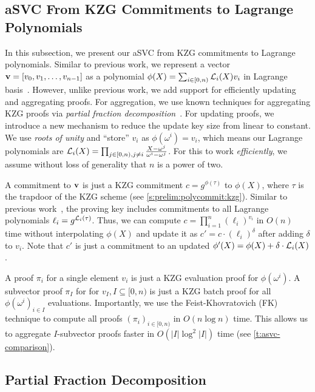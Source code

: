 \subsection{aSVC From KZG Commitments to Lagrange Polynomials}
\label{s:asvc:from-kzg}

In this subsection, we present our aSVC from KZG commitments to Lagrange polynomials.
Similar to previous work, we represent a vector $\bm{\mathrm{v}} = [v_0, v_1, \dots, v_{n-1}]$ as a polynomial $\phi(X)=\sum_{i\in[0,n)} \mathcal{L}_i(X)v_i$ in Lagrange basis~\cite{KZG10a,CDHK15,Tomescu20,GRWZ20}.
However, unlike previous work, we add support for efficiently updating and aggregating proofs.
For aggregation, we use known techniques for aggregating KZG proofs via \textit{partial fraction decomposition}~\cite{Buterin20UsingPoly}.
For updating proofs, we introduce a new mechanism to reduce the update key size from linear to constant.
We use \textit{roots of unity} and ``store'' $v_i$ as $\phi(\omega^i)=v_i$, which means our Lagrange polynomials are $\mathcal{L}_i(X)=\prod_{j\in [0,n),j\ne i} \frac{X-\omega^j}{\omega^i - \omega^j}$.
For this to work \textit{efficiently}, we assume without loss of generality that $n$ is a power of two.


A commitment to $\bm{\mathrm{v}}$ is just a KZG commitment $c=g^{\phi(\tau)}$ to $\phi(X)$, where $\tau$ is the trapdoor of the KZG scheme (see \cref{s:prelim:polycommit:kzg}).
Similar to previous work~\cite{CDHK15}, the proving key includes commitments to all Lagrange polynomials $\ell_i = g^{\mathcal{L}_i(\tau)}$.
Thus, we can compute $c=\prod_{i=1}^n (\ell_i)^{v_i}$ in $O(n)$ time without interpolating $\phi(X)$ and update it as
$c' = c\cdot (\ell_i)^{\delta}$ after adding $\delta$ to $v_i$.
Note that $c'$ is just a commitment to an updated $\phi'(X)=\phi(X)+\delta\cdot\mathcal{L}_i(X)$.

A proof $\pi_i$ for a single element $v_i$ is just a KZG evaluation proof for $\phi(\omega^i)$.
A subvector proof $\pi_I$ for for $v_I,I\subseteq[0,n)$ is just a KZG batch proof for all $\phi(\omega^i)_{i\in I}$ evaluations.
Importantly, we use the Feist-Khovratovich (FK)~\cite{FK20} technique to compute all proofs $(\pi_i)_{i\in[0,n)}$ in $O(n\log{n})$ time.
This allows us to aggregate $I$-subvector proofs faster in $O(\vert I \vert \log^2{|I|})$ time (see \cref{t:asvc-comparison}).

\subsection{Partial Fraction Decomposition}
\label{s:prelim:partial-fraction-decomposition}

